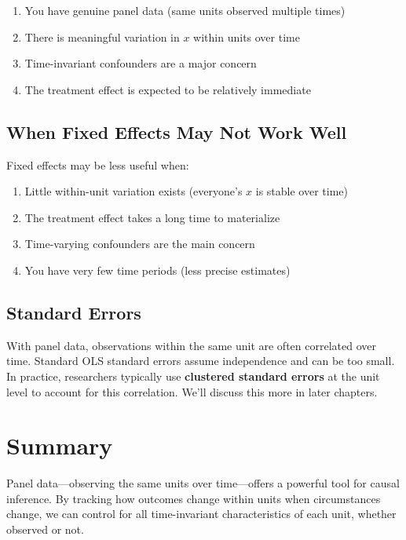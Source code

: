 \documentclass[
  letterpaper,
  DIV=11,
  numbers=noendperiod]{scrreprt}
\providecommand{\tightlist}{%
  \setlength{\itemsep}{0pt}\setlength{\parskip}{0pt}}
\begin{document}
\begin{enumerate}
\def\labelenumi{\arabic{enumi}.}
\tightlist
\item
  You have genuine panel data (same units observed multiple times)
\item
  There is meaningful variation in \(x\) within units over time
\item
  Time-invariant confounders are a major concern
\item
  The treatment effect is expected to be relatively immediate
\end{enumerate}

\subsection{When Fixed Effects May Not Work
Well}\label{when-fixed-effects-may-not-work-well}

Fixed effects may be less useful when:

\begin{enumerate}
\def\labelenumi{\arabic{enumi}.}
\tightlist
\item
  Little within-unit variation exists (everyone's \(x\) is stable over
  time)
\item
  The treatment effect takes a long time to materialize
\item
  Time-varying confounders are the main concern
\item
  You have very few time periods (less precise estimates)
\end{enumerate}

\subsection{Standard Errors}\label{standard-errors-1}

With panel data, observations within the same unit are often correlated
over time. Standard OLS standard errors assume independence and can be
too small. In practice, researchers typically use \textbf{clustered
standard errors} at the unit level to account for this correlation.
We'll discuss this more in later chapters.

\section{Summary}\label{summary-6}

Panel data---observing the same units over time---offers a powerful tool
for causal inference. By tracking how outcomes change within units when
circumstances change, we can control for all time-invariant
characteristics of each unit, whether observed or not.
\end{document}
